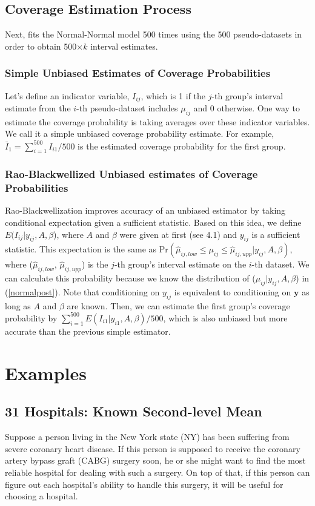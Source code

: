 \documentclass[article]{jss}
\begin{document}
\subsection{Coverage Estimation Process}
Next,  fits the Normal-Normal model 500 times using the 500 pseudo-datasets in order to obtain 500$\times k$ interval estimates.  

\subsubsection{Simple Unbiased Estimates of Coverage Probabilities}
Let's define an indicator variable, $I_{ij}$, which is 1 if the $j$-th group's interval estimate from the $i$-th pseudo-dataset includes $\mu_{ij}$ and 0 otherwise. One way to estimate the coverage probability is taking averages over these indicator variables. We call it a simple unbiased coverage probability estimate. For example, $\bar{I}_{1}=\sum_{i=1}^{500}I_{i1}/500$ is the estimated coverage probability for the first group.

\subsubsection{Rao-Blackwellized Unbiased estimates of Coverage Probabilities}
Rao-Blackwellization improves accuracy of an unbiased estimator by taking conditional expectation given a sufficient statistic. Based on this idea, we define $E(I_{ij}\vert y_{ij}, A, \beta$), where $A$ and $\beta$ were given at first (see 4.1) and $y_{ij}$ is a sufficient statistic. This expectation is the same as Pr$(\hat{\mu}_{ij, low}\le \mu_{ij} \le\hat{\mu}_{ij, upp}\vert y_{ij}, A, \beta)$, where ($\hat{\mu}_{ij, low}$, $\hat{\mu}_{ij, upp}$) is the $j$-th group's interval estimate on the $i$-th dataset. We can calculate this probability  because we know the distribution of ($\mu_{ij} \vert y_{ij}, A, \beta$) in (\ref{normalpost}). Note that conditioning on $y_{ij}$ is equivalent to conditioning on $\mathbf{y}$ as long as $A$ and $\beta$ are known. Then, we can estimate the first group's coverage probability by $\sum_{i=1}^{500}E(I_{i1}\vert y_{i1}, A, \beta)/500$, which is also unbiased but more accurate than the previous simple estimator.



\section[Examples]{Examples}
\subsection[Known Second-level Mean]{31 Hospitals: Known Second-level Mean}
Suppose a person living in the New York state (NY) has been suffering from severe coronary heart disease. If this person is supposed to receive the coronary artery bypass graft (CABG) surgery soon, he or she might want to find the most reliable hospital for dealing with such a surgery. On top of that, if this person can figure out each hospital's ability to handle this surgery, it will be useful for choosing a hospital.
\end{document}

